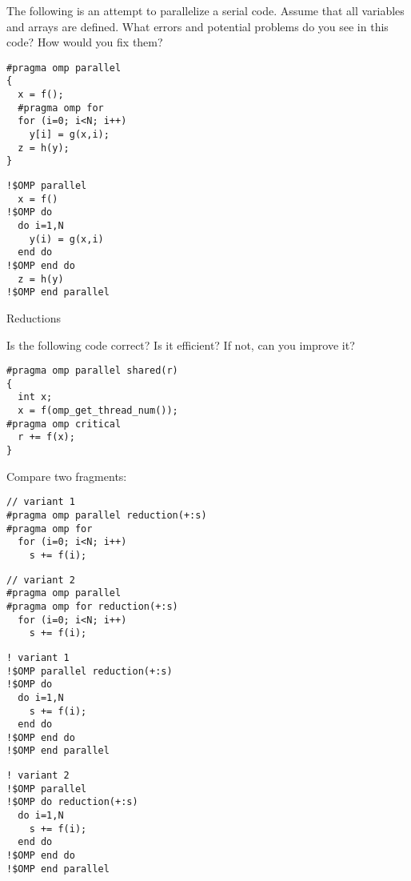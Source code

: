  {}

The following is an attempt to parallelize a serial code.
Assume that all variables and arrays are defined.
What errors and potential problems do you see in this code? How would you fix them?

\begin{multicols}{2}
\lstset{language=C}
\small
\begin{lstlisting}
#pragma omp parallel
{
  x = f();
  #pragma omp for
  for (i=0; i<N; i++)
    y[i] = g(x,i);
  z = h(y);
}
\end{lstlisting}
\columnbreak

\lstset{language=Fortran}
\begin{lstlisting}
!$OMP parallel
  x = f()
!$OMP do
  do i=1,N
    y(i) = g(x,i)
  end do
!$OMP end do 
  z = h(y)
!$OMP end parallel
\end{lstlisting}
\end{multicols}


\vfill\pagebreak

 {Reductions}

 {}

Is the following code correct? Is it efficient? If not, can you improve it?
\begin{verbatim}
#pragma omp parallel shared(r)
{
  int x;
  x = f(omp_get_thread_num());
#pragma omp critical
  r += f(x);
}
\end{verbatim}

 {}

Compare two fragments:
\begin{multicols}{2}
\lstset{language=C}
\begin{lstlisting}
// variant 1
#pragma omp parallel reduction(+:s)
#pragma omp for
  for (i=0; i<N; i++)
    s += f(i);
\end{lstlisting}
\columnbreak
\begin{lstlisting}
// variant 2
#pragma omp parallel 
#pragma omp for reduction(+:s)
  for (i=0; i<N; i++)
    s += f(i);
\end{lstlisting}
\end{multicols}

\begin{multicols}{2}
\lstset{language=Fortran}
\begin{lstlisting}
! variant 1
!$OMP parallel reduction(+:s)
!$OMP do
  do i=1,N
    s += f(i);
  end do
!$OMP end do
!$OMP end parallel 
\end{lstlisting}
\columnbreak
\begin{lstlisting}
! variant 2
!$OMP parallel 
!$OMP do reduction(+:s)
  do i=1,N
    s += f(i);
  end do
!$OMP end do
!$OMP end parallel 
\end{lstlisting}
\end{multicols}

